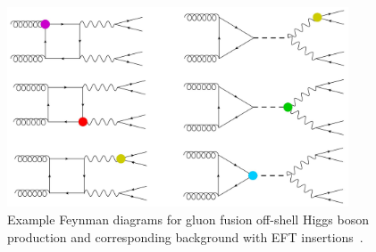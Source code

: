 \begin{figure}[!hbt]
\centering
\includegraphics[width=0.9\textwidth,clip] {figures/EFTdiagrams.jpg}
\caption{Example Feynman diagrams for gluon fusion off-shell Higgs boson production and corresponding background with EFT insertions~\cite{offshellWGnote}.}
\label{fig:EFTdiagrams}
\end{figure}





